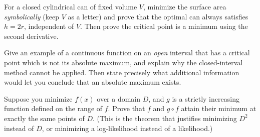 \begin{exercise}[Why $h=2r$, in general]
For a closed cylindrical can of fixed volume $V$, minimize the surface area
\emph{symbolically} (keep $V$ as a letter) and prove that the optimal can always
satisfies $h = 2r$, independent of $V$. Then prove the critical point is a minimum
using the second derivative.
\end{exercise}

\begin{exercise}
Give an example of a continuous function on an \emph{open} interval that has a
critical point which is not its absolute maximum, and explain why the closed-interval
method cannot be applied. Then state precisely what additional information would let
you conclude that an absolute maximum exists.
\end{exercise}

\begin{exercise}
Suppose you minimize $f(x)$ over a domain $D$, and $g$ is a strictly increasing
function defined on the range of $f$. Prove that $f$ and $g\circ f$ attain their
minimum at exactly the same points of $D$. (This is the theorem that justifies
minimizing $D^2$ instead of $D$, or minimizing a log-likelihood instead of a
likelihood.)
\end{exercise}
